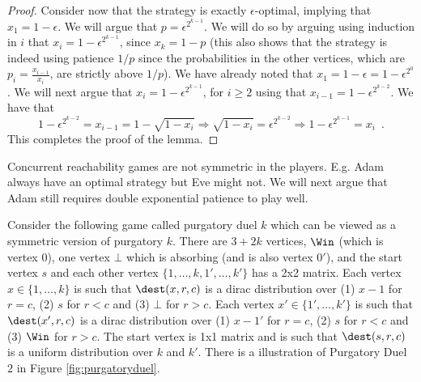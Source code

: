 \begin{proof}
Consider now that the strategy is exactly $\epsilon$-optimal, implying that $x_1=1-\epsilon$. 
We will argue that $p=\epsilon^{2^{k-1}}$.
We will do so by arguing  using induction in $i$ that $x_i=1-\epsilon^{2^{k-1}}$, since $x_k=1-p$ (this also shows that the strategy is indeed using patience $1/p$ since the probabilities in the other vertices, which are $p_i=\frac{x_{i-1}}{x_i}$, are strictly above $1/p$).
We have already noted that  $x_1=1-\epsilon=1-\epsilon^{2^0}$.
We will next argue that $x_i=1-\epsilon^{2^{k-1}}$, for $i\geq 2$ using that $x_{i-1}=1-\epsilon^{2^{k-2}}$.
We have that \[
1-\epsilon^{2^{k-2}}=x_{i-1}=1-\sqrt{1-x_{i}}\Rightarrow \sqrt{1-x_{i}}= \epsilon^{2^{k-2}}\Rightarrow
1-\epsilon^{2^{k-1}}=x_i\enspace .
\]
This completes the proof of the lemma.
\end{proof}

Concurrent reachability games are not symmetric in the players. E.g. Adam always have an optimal strategy but Eve might not. We will next argue that Adam still requires double exponential patience to play well.

Consider the following game called purgatory duel $k$ which can be viewed as a symmetric version of purgatory $k$.
There are $3+2k$ vertices, $\Win$ (which is vertex 0), one vertex $\bot$ which is absorbing (and is also vertex $0'$), and the start vertex $s$ and each other vertex $\{1,\dots, k,1',\dots,k'\}$ has a 2x2 matrix. Each vertex $x\in \{1,\dots, k\}$ is such that $\dest(x,r,c)$ is a dirac distribution over (1) $x-1$ for $r=c$, (2) $s$ for $r<c$ and (3) $\bot$ for $r>c$.
 Each vertex $x'\in \{1',\dots, k'\}$ is such that $\dest(x',r,c)$ is a dirac distribution over (1) $x-1'$ for $r=c$, (2) $s$ for $r<c$ and (3) $\Win$ for $r>c$. The start vertex is 1x1 matrix and is such that $\dest(s,r,c)$ is a uniform distribution over $k$ and $k'$.
There is a illustration of Purgatory Duel $2$ in Figure \ref{fig:purgatoryduel}.


